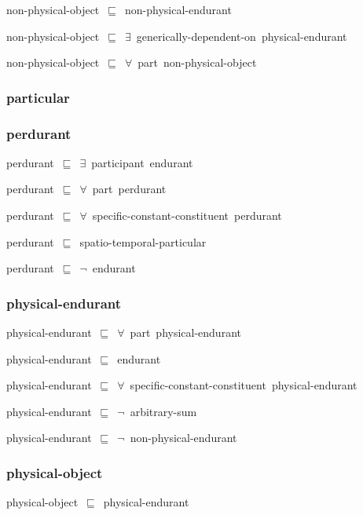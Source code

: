 \documentclass{article}
\begin{document}
non-physical-object~\ensuremath{\sqsubseteq}~non-physical-endurant~

non-physical-object~\ensuremath{\sqsubseteq}~\ensuremath{\exists}~generically-dependent-on~physical-endurant~

non-physical-object~\ensuremath{\sqsubseteq}~\ensuremath{\forall}~part~non-physical-object~

\subsubsection*{particular}

\subsubsection*{perdurant}

perdurant~\ensuremath{\sqsubseteq}~\ensuremath{\exists}~participant~endurant~

perdurant~\ensuremath{\sqsubseteq}~\ensuremath{\forall}~part~perdurant~

perdurant~\ensuremath{\sqsubseteq}~\ensuremath{\forall}~specific-constant-constituent~perdurant~

perdurant~\ensuremath{\sqsubseteq}~spatio-temporal-particular~

perdurant~\ensuremath{\sqsubseteq}~\ensuremath{\lnot}~endurant

\subsubsection*{physical-endurant}

physical-endurant~\ensuremath{\sqsubseteq}~\ensuremath{\forall}~part~physical-endurant~

physical-endurant~\ensuremath{\sqsubseteq}~endurant~

physical-endurant~\ensuremath{\sqsubseteq}~\ensuremath{\forall}~specific-constant-constituent~physical-endurant~

physical-endurant~\ensuremath{\sqsubseteq}~\ensuremath{\lnot}~arbitrary-sum

physical-endurant~\ensuremath{\sqsubseteq}~\ensuremath{\lnot}~non-physical-endurant

\subsubsection*{physical-object}

physical-object~\ensuremath{\sqsubseteq}~physical-endurant~
\end{document}
